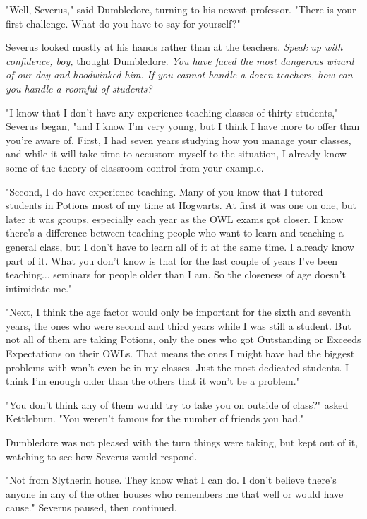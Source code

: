 \documentclass[a4paper,11pt]{article}
\begin{document}
"Well, Severus," said Dumbledore, turning to his newest professor. "There is your first challenge. What do you have to say for yourself?"

Severus looked mostly at his hands rather than at the teachers. \emph{Speak up with confidence, boy,} thought Dumbledore. \emph{You have faced the most dangerous wizard of our day and hoodwinked him. If you cannot handle a dozen teachers, how can you handle a roomful of students?}

"I know that I don't have any experience teaching classes of thirty students," Severus began, "and I know I'm very young, but I think I have more to offer than you're aware of. First, I had seven years studying how you manage your classes, and while it will take time to accustom myself to the situation, I already know some of the theory of classroom control from your example.

"Second, I do have experience teaching. Many of you know that I tutored students in Potions most of my time at Hogwarts. At first it was one on one, but later it was groups, especially each year as the OWL exams got closer. I know there's a difference between teaching people who want to learn and teaching a general class, but I don't have to learn all of it at the same time. I already know part of it. What you don't know is that for the last couple of years I've been teaching... seminars for people older than I am. So the closeness of age doesn't intimidate me."

"Next, I think the age factor would only be important for the sixth and seventh years, the ones who were second and third years while I was still a student. But not all of them are taking Potions, only the ones who got Outstanding or Exceeds Expectations on their OWLs. That means the ones I might have had the biggest problems with won't even be in my classes. Just the most dedicated students. I think I'm enough older than the others that it won't be a problem."

"You don't think any of them would try to take you on outside of class?" asked Kettleburn. "You weren't famous for the number of friends you had."

Dumbledore was not pleased with the turn things were taking, but kept out of it, watching to see how Severus would respond.

"Not from Slytherin house. They know what I can do. I don't believe there's anyone in any of the other houses who remembers me that well or would have cause." Severus paused, then continued.
\end{document}
